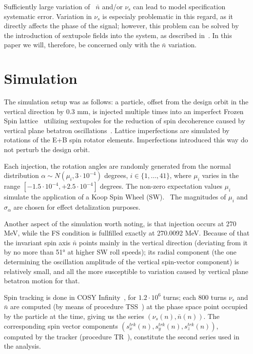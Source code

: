 \documentclass[a4paper]{jacow}
\newcommand{\nbar}{\bar n}
\begin{document}
Sufficiently large variation of~ $\nbar$ and/or $\nu_s$ can lead to model specification systematic error.
Variation in $\nu_s$ is especialy problematic in this regard, as it directly affects the phase of the signal;
however, this problem can be solved by the introduction of sextupole fields into the system,
as described in~\cite{Aksentev:DecohIPAC19}. In this paper we will, therefore, be concerned only with the $\nbar$
variation.

\section{Simulation}
The simulation setup was as follows: a particle, offset from the design orbit in the vertical
direction by 0.3 mm, is injected multiple times into an imperfect
Frozen Spin lattice~\cite{Senichev:Lattices} utilizing sextupoles for
the reduction of spin decoherence caused by vertical plane betatron
oscillations~\cite{Aksentev:DecohIPAC19}. Lattice imperfections are simulated by rotations of the E+B spin
rotator elements. Imperfections introduced this way do not perturb the design orbit.

Each injection, the rotation angles are randomly generated from the
normal distribution $\alpha\sim N(\mu_i, 3\cdot 10^{-4})$ degrees, $i\in\{1,\dots,41\}$, where
$\mu_i$ varies in the range $[-1.5\cdot10^{-4}, +2.5\cdot10^{-4}]$ degrees. The non-zero expectation values $\mu_i$
simulate the application of a Koop Spin Wheel (SW).~\cite{Koop:SW} The magnitudes of $\mu_i$ and $\sigma_{\alpha}$
are chosen for effect detalization purposes.

Another aspect of the simulation worth noting, is that injection occurs at 270 MeV, while the FS condition
is fullfilled exactly at 270.0092 MeV. Because of that the invariant spin axis $\nbar$
points mainly in the vertical direction (deviating from it by no more than \ang{51} at higher SW roll speeds);
its radial component (the one determining the oscillation amplitude of the vertical spin-vector component)
is relatively small, and all the more susceptible to variation caused by vertical plane betatron motion for that. 

Spin tracking is done in COSY Infinity~\cite{COSYINF:Website}, for $1.2\cdot10^6$ turns; each 800 turns
$\nu_s$ and $\nbar$ are computed (by means of procedure TSS~\cite[p.~41]{COSYINF:BeamPhysMan}) at
the phase space point occupied by the particle at the time, giving us the series $(\nu_s(n), \nbar(n))$.
The corresponding spin vector components $(s_x^{trk}(n), s_y^{trk}(n), s_z^{trk}(n))$,
computed by the tracker (procedure
TR~\cite[p.~41]{COSYINF:BeamPhysMan}), 
constitute the second series used in the analysis.
\end{document}
